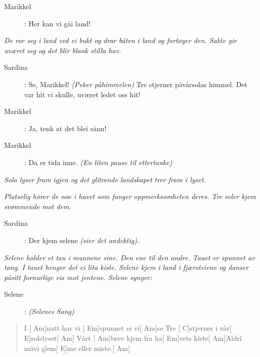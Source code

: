 {\begin{description}
\item[Marikkel]: Her kan vi g\aa  i land! 
\end{description}

\noindent \textit{\color{gray} De ror seg i land ved ei bukt og drar b\aa ten i land og fort\o{}yer den. Sakte gir uv\ae ret seg og det blir blank stilla hav.}

\begin{description}
\item[Sardina]: Se, Marikkel!  \textit{\color{gray} (Peker p\aa  himmelen)} Tre stjerner p\aa  v\aa rsolas himmel. Det var hit vi skulle, uv\ae ret ledet oss hit!
\item[Marikkel]: Ja, tenk at det blei s\aa nn!
\item[Marikkel]: Da er tida inne.  \textit{\color{gray} (En liten pause til ettertanke)} 
\end{description}

\noindent \textit{\color{gray} Sola lyser fram igjen og det glitrende landskapet trer fram i lyset.}

\noindent \textit{\color{gray} Plutselig h\o{}rer de noe i havet som fanger oppmerksomheten deres. Tre seler kjem sv\o{}mmende mot dem.}

\begin{description}
\item[Sardina]: Der kjem selene  \textit{\color{gray} (sier det andektig)}. 
\end{description}

\noindent \textit{\color{gray} Selene holder et tau i munnene sine. Den ene til den andre. Tauet er spunnet av tang. I tauet henger det ei lita kiste. Selene kjem i land i fj\ae rsteiene og danser p\aa  sitt fornurlige vis mot jentene. Selene synger:}

\begin{description}
\item[Selene]: \textit{\color{gray} (Selenes Sang)} 
\end{description}

\begin{quote}
\begin{guitar}
\smallskip
I [\color{gray} Am]natt har vi [\color{gray} Em]spunnet ei vi[\color{gray} Am]se\smallskip
Tre [\color{gray} C]stjerner i v\aa r[\color{gray} E]solelyset[\color{gray} Am]\smallskip
V\aa rt [\color{gray} Am]brev kjem fra ha[\color{gray} Em]vets kiste[\color{gray} Am]Aldri m\aa  vi glem[\color{gray} E]me eller miste.[\color{gray} Am]


\end{guitar}
\end{quote}}
